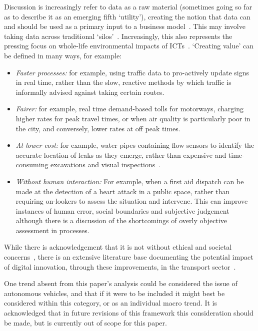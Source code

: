 \documentclass[b5paper,10pt]{article}
\begin{document}
Discussion is increasingly refer to data as a raw material (sometimes
going so far as to describe it as an emerging fifth `utility'),
creating the notion that data can and should be used as a primary
input to a business model~\citep{arup-et-al:2011}. This may involve
taking data across traditional
`silos'~\citep{shapiro:2006,tsoukalas:2008}. Increasingly, this also
represents the pressing focus on whole-life environmental impacts of
ICTs~\citep{cooper-et-al-gsict:2015}. `Creating value' can be defined
in many ways, for example:

\begin{itemize}
\item {\emph{Faster processes:}} for example, using traffic data to
pro-actively update signs in real time, rather than the slow, reactive
methods by which traffic is informally advised against taking certain
routes.
\item {\emph{Fairer:}} for example, real time demand-based tolls for
motorways, charging higher rates for peak travel times, or when air
quality is particularly poor in the city, and conversely, lower rates
at off peak times.
\item {\emph{At lower cost:}} for example, water pipes containing flow
sensors to identify the accurate location of leaks as they emerge,
rather than expensive and time-consuming excavations and visual
inspections~\citep{cosgrave-et-al:2014}.
\item {\emph{Without human interaction:}} For example, when a first
aid dispatch can be made at the detection of a heart attack in a
public space, rather than requiring on-lookers to assess the situation
and intervene. This can improve instances of human error, social
boundaries and subjective judgement although there is a discussion of
the shortcomings of overly objective assessment in processes.
\end{itemize}

While there is acknowledgement that it is not without ethical and
societal concerns~\citep{bimber:1990,oatley-et-al_dasc:2015}, there is
an extensive literature base documenting the potential impact of
digital innovation, through these improvements, in the transport
sector~\citep{enoch:2015}.

One trend absent from this paper's analysis could be considered the
issue of autonomous vehicles, and that if it were to be included it
might best be considered within this category, or as an individual
macro trend. It is acknowledged that in future revisions of this
framework this consideration should be made, but is currently out of
scope for this paper.
\end{document}
